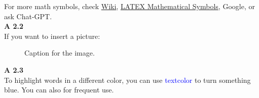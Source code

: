 \documentclass{article}
\newcommand{\important}[1]{{\color{blue}{\bf\sf #1}}}
\begin{document}
\noindent
For more math symbols, check \href{https://oeis.org/wiki/List_of_LaTeX_mathematical_symbols}{Wiki}, \href{https://www.cmor-faculty.rice.edu/~heinken/latex/symbols.pdf}{LATEX Mathematical Symbols}, Google, or ask Chat-GPT.\\

\noindent
\textbf{A 2.2}\\

If you want to insert a picture:

\begin{figure}[h]
\centering
\caption{Caption for the image.}
\label{fig:image1}
\end{figure}

\noindent
\textbf{A 2.3}\\

To highlight words in a different color, you can use \textcolor{blue}{textcolor} to turn something blue. You can also \important{define custom commands} for frequent use.
\end{document}
